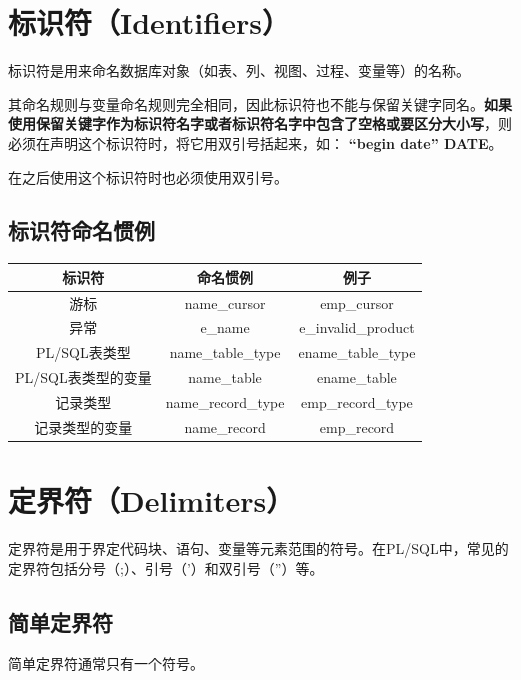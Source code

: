 \documentclass[11pt, a4paper, oneside, UTF8]{ctexbook}
\let\kaishu\relax %
\begin{document}
\section{标识符（Identifiers）}
标识符是用来命名数据库对象（如表、列、视图、过程、变量等）的名称。

其命名规则与变量命名规则完全相同，因此标识符也不能与保留关键字同名。{\bfseries\kaishu 如果使用保留关键字作为标识符名字或者标识符名字中包含了空格或要区分大小写}，则必须在声明这个标识符时，将它用双引号括起来，如：  {\bfseries\kaishu “begin date” DATE}。

在之后使用这个标识符时也必须使用双引号。

\subsection{标识符命名惯例}

\begin{center}
  \begin{minipage}{\textwidth}
    \centering %
    \begin{tabular}{|c|c|c|} %
      \hline %
      \textbf{标识符} & \textbf{命名惯例}  & \textbf{例子} \\
      \hline
      游标 & name\_cursor & emp\_cursor \\
      异常 & e\_name & e\_invalid\_product \\
      PL/SQL表类型 & name\_table\_type & ename\_table\_type \\
      PL/SQL表类型的变量 & name\_table  & ename\_table \\
      记录类型 & name\_record\_type & emp\_record\_type \\
      记录类型的变量 & name\_record & emp\_record \\
      \hline
    \end{tabular}
    \captionsetup{hypcap=false}
    \label{tab:标识符命名惯例} %
  \end{minipage}
\end{center}

\section{定界符（Delimiters）}
定界符是用于界定代码块、语句、变量等元素范围的符号。在PL/SQL中，常见的定界符包括分号（;）、引号（'）和双引号（''）等。
\subsection{简单定界符}
简单定界符通常只有一个符号。
\end{document}
